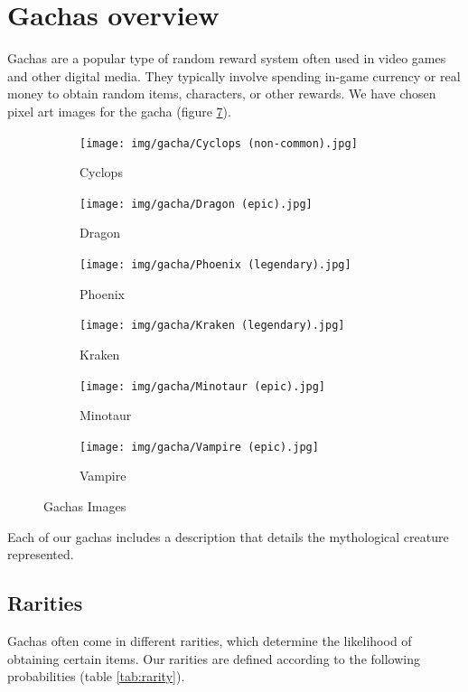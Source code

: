\documentclass{article}
\begin{document}
\section{Gachas overview}
Gachas are a popular type of random reward system often used in video games and other digital media. They typically involve spending in-game currency or real money to obtain random items, characters, or other rewards.
We have chosen pixel art images for the gacha (figure \ref{fig:gachas_images}).
\begin{figure}[h!]
    \centering
    \begin{subfigure}[b]{0.3\textwidth}
        \centering
        \texttt{[image: img/gacha/Cyclops (non-common).jpg]}
        \caption{Cyclops}
        \label{fig:cyclops}
    \end{subfigure}
    \hfill
    \begin{subfigure}[b]{0.3\textwidth}
        \centering
        \texttt{[image: img/gacha/Dragon (epic).jpg]}
        \caption{Dragon}
        \label{fig:dragon}
    \end{subfigure}
    \hfill
    \begin{subfigure}[b]{0.3\textwidth}
        \centering
        \texttt{[image: img/gacha/Phoenix (legendary).jpg]}
        \caption{Phoenix}
        \label{fig:phoenix}
    \end{subfigure}
    \vspace{1em} 
    \begin{subfigure}[b]{0.3\textwidth}
        \centering
        \texttt{[image: img/gacha/Kraken (legendary).jpg]}
        \caption{Kraken}
        \label{fig:kraken}
    \end{subfigure}
    \hfill
    \begin{subfigure}[b]{0.3\textwidth}
        \centering
        \texttt{[image: img/gacha/Minotaur (epic).jpg]}
        \caption{Minotaur}
        \label{fig:minotaur}
    \end{subfigure}
    \hfill
    \begin{subfigure}[b]{0.3\textwidth}
        \centering
        \texttt{[image: img/gacha/Vampire (epic).jpg]}
        \caption{Vampire}
        \label{fig:vampire}
    \end{subfigure}
    \caption{Gachas Images}
    \label{fig:gachas_images}
    \label{fig:gachas_images}
\end{figure}

Each of our gachas includes a description that details the mythological creature represented.

\subsection{Rarities}
Gachas often come in different rarities, which determine the likelihood of obtaining certain items. Our rarities are defined according to the following probabilities (table \ref{tab:rarity}).
\end{document}
